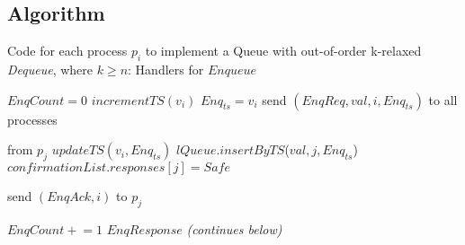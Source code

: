 \documentclass[a4paper,anonymous,USenglish]{lipics-v2021} %
\theoremstyle{definition}
\newcommand{\red}[1]{\textcolor{red}{#1}} %
\newcommand{\pluseq}{\mathrel{+}=}
\begin{document}
\subsection{Algorithm}

\begin{algorithm}
  \caption{Code for each process $p_i$ to implement a Queue with out-of-order k-relaxed \textit{Dequeue}, where $k \geq n$: Handlers for $Enqueue$}\label{alg:relaxed}
  \begin{algorithmic}[1]
    \Statex \Comment{\red{Is this entirely the same as for unrelaxed queues? I know I said to keep it, but I'm second-guessing whether we should include it if it's in a separate algorithm block and completely unchanged.}
}
      \State $EnqCount = 0$
      \State $incrementTS(v_i)$
      \State $Enq_{ts} = v_i$
      \State send $(EnqReq, val, i, Enq_{ts})$ to all processes
    \EndFunction

     from $p_j$
      \State $updateTS(v_i, Enq_{ts})$
      \State $lQueue.insertByTS$($val, j, Enq_{ts}$)
          \State $confirmationList.responses[j] = Safe$
        \EndIf
      \EndFor

      \State send $(EnqAck, i)$ to $p_j$
    \EndFunction

      \State $EnqCount \pluseq 1$
        \Return $EnqResponse$
      \EndIf
    \EndFunction
    \Statex
    \Statex \emph{(continues below)}
  \end{algorithmic}
\end{algorithm}
\end{document}
